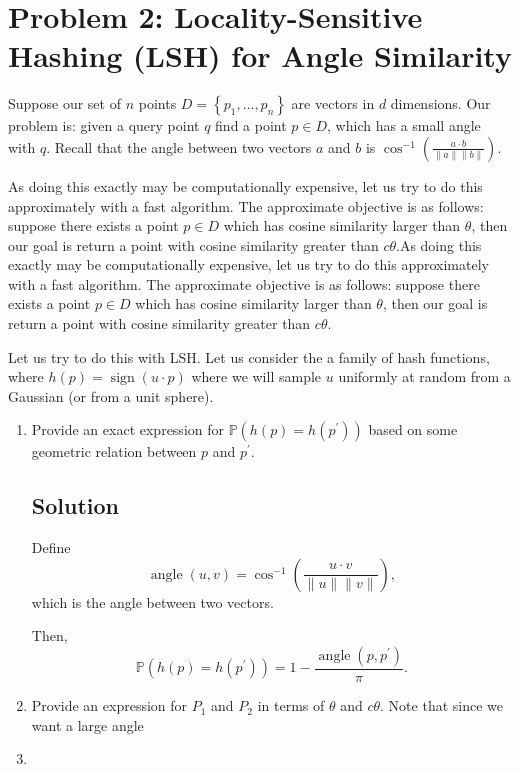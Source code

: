 \section*{Problem 2: Locality-Sensitive Hashing (LSH) for Angle Similarity}

Suppose our set of $n$ points $D = \left\{p_1,\ldots,p_n\right\}$ are vectors in
$d$ dimensions. Our problem is: given a query point $q$ find a point $p \in D$,
which has a small angle with $q$. Recall that the angle between two vectors $a$
and $b$ is
$\cos^{-1}\left(\frac{a \cdot b}{\lVert a \rVert \lVert b \rVert} \right).$

As doing this exactly may be computationally expensive, let us try to do this
approximately with a fast algorithm. The approximate objective is as follows:
suppose there exists a point $p \in D$ which has cosine similarity larger than
$\theta$, then our goal is return a point with cosine similarity greater than
$c\theta$.As doing this exactly may be computationally expensive, let us try to
do this approximately with a fast algorithm. The approximate objective is as
follows: suppose there exists a point $p \in D$ which has cosine similarity
larger than $\theta$, then our goal is return a point with cosine similarity
greater than $c\theta$.

Let us try to do this with LSH. Let us consider the a family of hash functions,
where $h(p) = \operatorname{sign}\left(u \cdot p\right)$ where we will sample
$u$ uniformly at random from a Gaussian (or from a unit sphere).

\begin{enumerate}
\item Provide an exact expression for
  $\mathbb{P}\left(h\left(p\right) = h\left(p^\prime\right)\right)$ based on
  some geometric relation between $p$ and $p^\prime$.

  \subsection*{Solution}

  Define
  \begin{equation}
    \operatorname{angle}\left(u, v\right) =
    \cos^{-1}\left(\frac{u \cdot v}{\lVert u \rVert \lVert v \rVert} \right),
  \end{equation}
  which is the angle between two vectors.

  Then,
  \begin{equation}
    \boxed{\mathbb{P}\left(h\left(p\right) = h\left(p^\prime\right)\right)
      = 1 - \frac{\operatorname{angle}\left(p,p^\prime\right)}{\pi}.}
  \end{equation}
\item Provide an expression for $P_1$ and $P_2$ in terms of $\theta$ and
  $c\theta$. Note that since we want a large angle
\item 
\end{enumerate}
